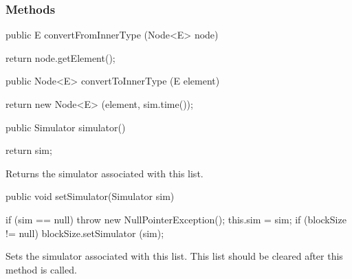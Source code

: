 \subsubsection* {Methods}
\begin{code}

   public E convertFromInnerType (Node<E> node)\begin{hide} {
      return node.getElement();
   }\end{hide}

   public Node<E> convertToInnerType (E element)\begin{hide} {
      return new Node<E> (element, sim.time());
   }\end{hide}

   public Simulator simulator() \begin{hide} {
      return sim;
   } \end{hide}
\end{code}
 \begin{tabb}   Returns the simulator associated with this list.
 \end{tabb}
\begin{htmlonly}
\end{htmlonly}
\begin{code}

   public void setSimulator(Simulator sim) \begin{hide} {
       if (sim == null)
         throw new NullPointerException();
      this.sim = sim;
      if (blockSize != null)
         blockSize.setSimulator (sim);
   } \end{hide}
\end{code}
 \begin{tabb}   Sets the simulator associated with this list.
   This list should be cleared after this method is called.
 \end{tabb}
\begin{htmlonly}
\end{htmlonly}
